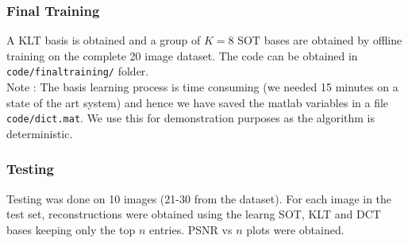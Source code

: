 \documentclass{article}
\theoremstyle{remark}
\begin{document}
\subsubsection*{Final Training}
A KLT basis is obtained and a group of $K=8$ SOT bases are obtained by offline training on the complete 20 image dataset. The code can be obtained in {\tt code/finaltraining/} folder.\\[1mm]
Note : The basis learning process is time consuming (we needed 15 minutes on a state of the art system) and hence we have saved the matlab variables in a file {\tt code/dict.mat}. We use this for demonstration purposes as the algorithm is deterministic.
\subsubsection*{Testing}
Testing was done on 10 images (21-30 from the dataset). For each image in the test set, reconstructions were obtained using the learng SOT, KLT and DCT bases keeping only the top $n$ entries. PSNR vs $n$ plots were obtained.
\end{document}
